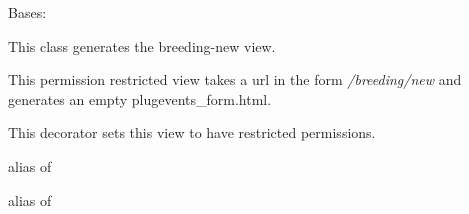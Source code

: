 \documentclass[letterpaper,10pt,english]{sphinxmanual}
\begin{document}
\begin{fulllineitems}
\label{api:mousedb.animal.views.BreedingCreate}
Bases: \href{http://docs.djangoproject.com/en/dev/ref/class-based-views/\#django.views.generic.edit.CreateView}{}

This class generates the breeding-new view.

This permission restricted view takes a url in the form \emph{/breeding/new} and generates an empty plugevents\_form.html.


\begin{fulllineitems}
\label{api:mousedb.animal.views.BreedingCreate.dispatch}
This decorator sets this view to have restricted permissions.

\end{fulllineitems}



\begin{fulllineitems}
\label{api:mousedb.animal.views.BreedingCreate.form_class}
alias of 

\end{fulllineitems}



\begin{fulllineitems}
\label{api:mousedb.animal.views.BreedingCreate.model}
alias of 

\end{fulllineitems}


\end{fulllineitems}


\end{document}
